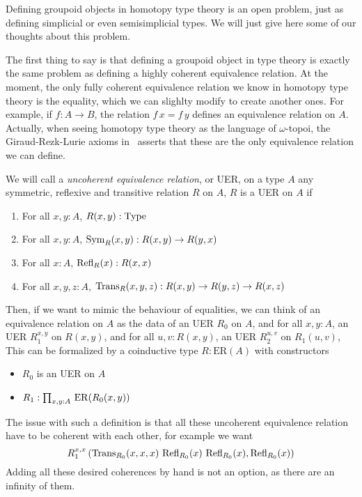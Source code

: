 Defining groupoid objects in homotopy type theory is an open problem,
just as defining simplicial or even semisimplicial types. We will just
give here some of our thoughts about this problem.

The first thing to say is that defining a groupoid object in type
theory is exactly the same problem as defining a highly coherent
equivalence relation. At the moment, the only fully coherent
equivalence relation we know in homotopy type theory is the equality,
which we can slighlty modify to create another ones. For example, if
$f:A\to B$, the relation $f\, x = f\, y$ defines an equivalence
relation on $A$.
Actually, when seeing homotopy type theory as the language of
$\omega$-topoi, the Giraud-Rezk-Lurie axioms in~\cite{lurie} asserts
that these are the only equivalence relation we can define.

We will call a {\em uncoherent equivalence relation}, or UER, on a
type $A$ any symmetric, reflexive and transitive relation $R$ on $A$,
\ie{} $R$ is a UER on $A$ if
\begin{enumerate}
\item For all $x,y:A$, $R(x,y) : \operatorname{Type}$
\item For all $x,y:A$, $\operatorname{Sym}_R(x,y) : R(x,y) \to R(y,x)$
\item For all $x:A$, $\operatorname{Refl}_R(x) : R(x,x)$
\item For all $x,y,z:A$, $\operatorname{Trans}_R(x,y,z) : R(x,y) \to R(y,z) \to R(x,z)$
\end{enumerate}

Then, if we want to mimic the behaviour of equalities, we can think of
an equivalence relation on $A$ as the data of an UER $R_0$ on $A$, and for all
$x,y:A$, an UER $R_1^{x,y}$ on $R(x,y)$, and for all $u,v:R(x,y)$, an
UER $R_2^{u,v}$ on $R_1(u,v)$, \etc
This can be formalized by a coinductive type $R:\mathrm{ER}(A)$ with
constructors
\begin{itemize}
\item $R_0$ is an UER on $A$
\item $R_1:\prod_{x,y:A}\, \mathrm{ER}(R_0(x,y))$
\end{itemize}
The issue with such a definition is that all these uncoherent
equivalence relation have to be coherent with each other, for example
we want
\[
  R_1^{x,x}\left(\operatorname{Trans}_{R_0}(x,x,x)\, \operatorname{Refl}_{R_0}(x)\, \operatorname{Refl}_{R_0}(x),\operatorname{Refl}_{R_0}(x)\right)
\]
Adding all these desired coherences by hand is not an option, as there
are an infinity of them.

